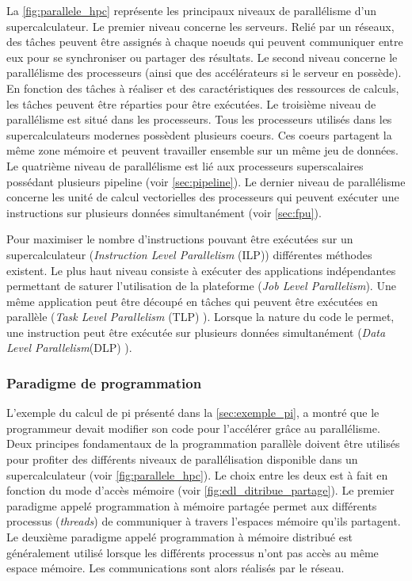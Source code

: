             La \autoref{fig:parallele_hpc} représente les principaux niveaux de parallélisme d'un supercalculateur.
            Le premier niveau concerne les serveurs. Relié par un réseaux, des tâches peuvent être assignés à chaque noeuds qui peuvent communiquer entre eux pour se synchroniser ou partager des résultats. 
            Le second niveau concerne le parallélisme des processeurs (ainsi que des accélérateurs si le serveur en possède). En fonction des tâches à réaliser et des caractéristiques des ressources de calculs, les tâches peuvent être réparties pour être exécutées. 
            Le troisième niveau de parallélisme est situé dans les processeurs. Tous les processeurs utilisés dans les supercalculateurs modernes possèdent plusieurs coeurs. Ces coeurs partagent la même zone mémoire et peuvent travailler ensemble sur un même jeu de données.
            Le quatrième niveau de parallélisme est lié aux processeurs superscalaires possédant plusieurs pipeline (voir \autoref{sec:pipeline}).
            Le dernier niveau de parallélisme concerne les unité de calcul vectorielles des processeurs qui peuvent exécuter une instructions sur plusieurs données simultanément (voir \autoref{sec:fpu}).
            
            Pour maximiser le nombre d'instructions pouvant être exécutées sur un supercalculateur (\textit{Instruction Level Parallelism} (ILP)) différentes méthodes existent. Le plus haut niveau consiste à exécuter des applications indépendantes permettant de saturer l'utilisation de la plateforme (\textit{Job Level Parallelism}). Une même application peut être découpé en tâches qui peuvent être exécutées en parallèle (\textit{Task Level Parallelism} (TLP) \cite{Kambadur2009}). Lorsque la nature du code le permet, une instruction peut être exécutée sur plusieurs données simultanément (\textit{Data Level Parallelism}(DLP) \cite{Espasa1997}).
            
            
        \subsubsection{Paradigme de programmation}
       
             L'exemple du calcul de pi présenté dans la \autoref{sec:exemple_pi}, a montré que le programmeur devait modifier son code pour l'accélérer grâce au parallélisme. Deux principes fondamentaux de la programmation parallèle doivent être utilisés pour profiter des différents niveaux de parallélisation disponible dans un supercalculateur (voir \autoref{fig:parallele_hpc}).  Le choix entre les deux est à fait en fonction du mode d'accès mémoire (voir \autoref{fig:edl_ditribue_partage}). Le premier paradigme appelé programmation à mémoire partagée permet aux différents processus (\textit{threads}) de communiquer à travers l'espaces mémoire qu'ils partagent. Le deuxième paradigme appelé programmation à mémoire distribué est généralement utilisé lorsque les différents processus n'ont pas accès au même espace mémoire. Les communications sont alors réalisés par le réseau.
            
